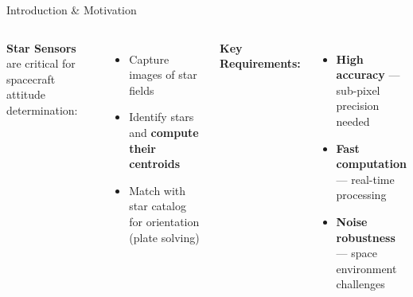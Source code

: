 

\begin{frame}
    \titlepage
\end{frame}

\begin{frame}{Introduction \& Motivation}
    \begin{columns}
        \textbf{Star Sensors} are critical for spacecraft attitude determination:
        \begin{itemize}
            \item Capture images of star fields
            \item Identify stars and \textbf{compute their centroids}
            \item Match with star catalog for orientation (plate solving)
        \end{itemize}
        
        \vspace{0.5cm}
        \textbf{Key Requirements:}
        \begin{itemize}
            \item \textcolor{starblue}{\textbf{High accuracy}} — sub-pixel precision needed
            \item \textcolor{starblue}{\textbf{Fast computation}} — real-time processing
            \item \textcolor{starblue}{\textbf{Noise robustness}} — space environment challenges
        \end{itemize}
        
    \end{columns}
\end{frame}


